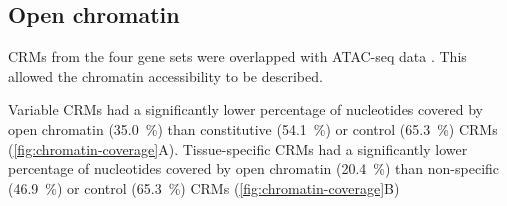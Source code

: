 \documentclass[../main.tex]{subfiles}
\begin{document}
%		
%
%		
%		


\subsection{Open chromatin}
CRMs from the four gene sets were overlapped with ATAC-seq data \autocite{potterCytokininModulatesContextdependent2018}. This allowed the chromatin accessibility to be described.

Variable CRMs had a significantly lower percentage of nucleotides covered by open chromatin (\SI{35.0}{\percent}) than constitutive (\SI{54.1}{\percent}) or control (\SI{65.3}{\percent}) CRMs (\autoref{fig:chromatin-coverage}A). Tissue\hyp{}specific CRMs had a significantly lower percentage of nucleotides covered by open chromatin (\SI{20.4}{\percent}) than non\hyp{}specific (\SI{46.9}{\percent}) or control (\SI{65.3}{\percent}) CRMs (\autoref{fig:chromatin-coverage}B)
\end{document}
